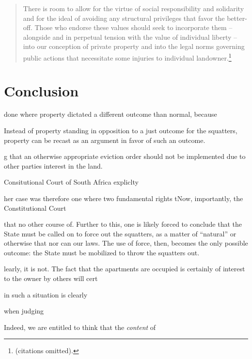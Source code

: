 \begin{quote}
There is room to allow for the virtue of social responsibility and solidarity and for the ideal of avoiding any structural privileges that favor the better-off. Those who endorse these values should seek to
incorporate them -- alongside and in perpetual tension with the value of
individual liberty -- into our conception of private property and into the legal norms governing
public actions that necessitate some injuries to individual landowner.\footnote{\cite[802]{dagan99} (citations omitted).}
\end{quote}

\section{Conclusion}




done where property dictated a different outcome than normal, because 

Instead of property standing in opposition to a just outcome for the squatters, property can be recast as an argument in favor of such an outcome.





g that an otherwise appropriate eviction order should not be implemented due to other parties interest in the land. 


Consitutional Court of South Africa expliclty


her case was therefore one where two fundamental rights tNow, importantly, the Constitutional Court 



that no other course of. Further to this, one is likely forced to conclude that the State must be called on to force out the squatters, as a matter of ``natural'' or otherwise  that nor can our laws. The use of force, then, becomes the only possible outcome: the State must be mobilized to throw the squatters out. 





learly, it is not. The fact that the apartments are occupied is certainly of interest to the owner by others will cert

in such a situation is clearly 


when judging 

 Indeed, we are entitled to think that the {\it content} of 

